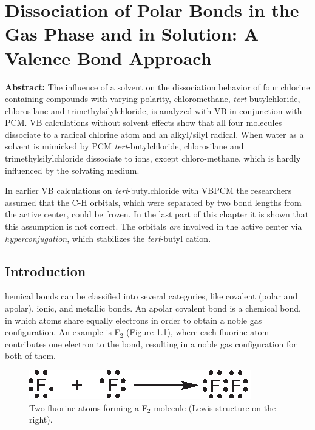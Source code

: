 \chapter{Dissociation of Polar Bonds in the Gas Phase and in Solution: A Valence Bond Approach}
\label{chap_dissociation}


\noindent\textbf{Abstract:} The influence of a solvent on the dissociation behavior of four chlorine containing compounds with varying polarity, chloromethane, \textit{tert}-butylchloride, chlorosilane and trimethylsilylchloride, is analyzed with VB in conjunction with PCM. VB calculations without solvent effects show that all four molecules dissociate to a radical chlorine atom and an alkyl/silyl radical. When water as a solvent is mimicked by PCM \textit{tert}-butylchloride, chlorosilane and trimethylsilylchloride dissociate to ions, except chloro-methane, which is hardly influenced by the solvating medium.

In earlier VB calculations on  \textit{tert}-butylchloride with VBPCM the researchers assumed that the C-H orbitals, which were separated by two bond lengths from the active center, could be frozen. In the last part of this chapter it is shown that this assumption is not correct. The orbitals \textit{are} involved in the active center via \textit{hyperconjugation}, which stabilizes the \textit{tert}-butyl cation. 

\clearpage

\section{Introduction}

\lettrine{}{}hemical bonds can be classified into several categories, like covalent (polar and apolar), ionic, and metallic bonds. An apolar covalent bond is a chemical bond, in which atoms share equally electrons in order to obtain a noble gas configuration. An example is F$_2$ (Figure \ref{ch3.fig.f_twee}), where each fluorine atom contributes one electron to the bond, resulting in a noble gas configuration for both of them.
\begin{figure}[ht]
\center
\includegraphics{dissociation/figures/f_twee.eps}
\caption{Two fluorine atoms forming a F$_2$ molecule (Lewis structure on the right).}
\label{ch3.fig.f_twee} 
\end{figure}


